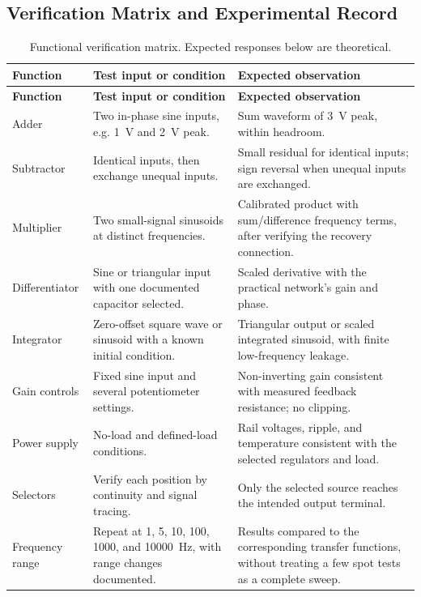 \documentclass[11pt,a4paper]{article}
\begin{document}
\subsection{Verification Matrix and Experimental Record}
\begin{longtable}{P{0.19\textwidth}P{0.38\textwidth}P{0.34\textwidth}}
\caption{Functional verification matrix. Expected responses below are theoretical.}\\
\toprule
\textbf{Function} & \textbf{Test input or condition} & \textbf{Expected observation}\\
\midrule\endfirsthead
\toprule\textbf{Function} & \textbf{Test input or condition} & \textbf{Expected observation}\\\midrule\endhead
Adder & Two in-phase sine inputs, e.g. 1~V and 2~V peak. & Sum waveform of 3~V peak, within headroom.\\
Subtractor & Identical inputs, then exchange unequal inputs. & Small residual for identical inputs; sign reversal when unequal inputs are exchanged.\\
Multiplier & Two small-signal sinusoids at distinct frequencies. & Calibrated product with sum/difference frequency terms, after verifying the recovery connection.\\
Differentiator & Sine or triangular input with one documented capacitor selected. & Scaled derivative with the practical network's gain and phase.\\
Integrator & Zero-offset square wave or sinusoid with a known initial condition. & Triangular output or scaled integrated sinusoid, with finite low-frequency leakage.\\
Gain controls & Fixed sine input and several potentiometer settings. & Non-inverting gain consistent with measured feedback resistance; no clipping.\\
Power supply & No-load and defined-load conditions. & Rail voltages, ripple, and temperature consistent with the selected regulators and load.\\
Selectors & Verify each position by continuity and signal tracing. & Only the selected source reaches the intended output terminal.\\
Frequency range & Repeat at 1, 5, 10, 100, 1000, and 10000~Hz, with range changes documented. & Results compared to the corresponding transfer functions, without treating a few spot tests as a complete sweep.\\
\bottomrule
\end{longtable}
\end{document}
